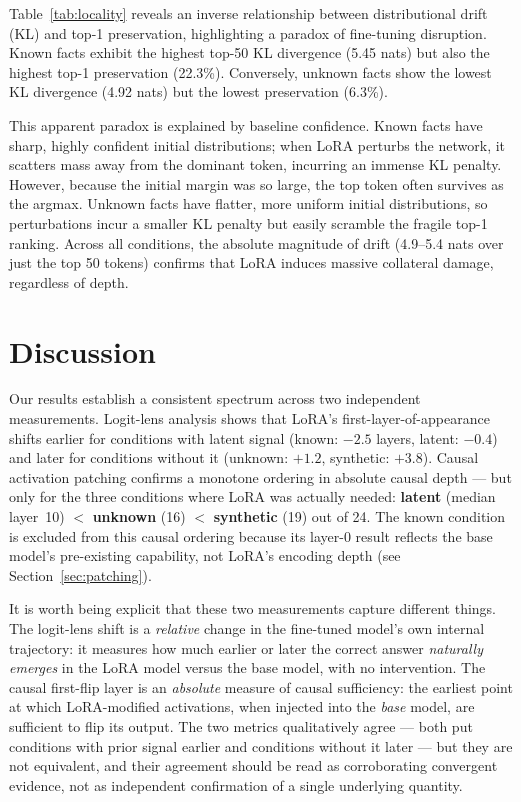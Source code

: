 \documentclass[11pt]{article}
\begin{document}
Table~\ref{tab:locality} reveals an inverse relationship between distributional drift (KL) and top-1 preservation, highlighting a paradox of fine-tuning disruption. Known facts exhibit the highest top-50 KL divergence (5.45 nats) but also the highest top-1 preservation (22.3\%). Conversely, unknown facts show the lowest KL divergence (4.92 nats) but the lowest preservation (6.3\%).

This apparent paradox is explained by baseline confidence. Known facts have sharp, highly confident initial distributions; when LoRA perturbs the network, it scatters mass away from the dominant token, incurring an immense KL penalty. However, because the initial margin was so large, the top token often survives as the argmax. Unknown facts have flatter, more uniform initial distributions, so perturbations incur a smaller KL penalty but easily scramble the fragile top-1 ranking. Across all conditions, the absolute magnitude of drift (4.9--5.4 nats over just the top 50 tokens) confirms that LoRA induces massive collateral damage, regardless of depth.

\section{Discussion}

Our results establish a consistent spectrum across two independent measurements.
Logit-lens analysis shows that LoRA's first-layer-of-appearance shifts earlier
for conditions with latent signal (known: $-2.5$ layers, latent: $-0.4$) and
later for conditions without it (unknown: $+1.2$, synthetic: $+3.8$).
Causal activation patching confirms a monotone ordering in absolute causal
depth --- but only for the three conditions where LoRA was actually needed:
\textbf{latent} (median layer~10) $<$ \textbf{unknown} (16) $<$
\textbf{synthetic} (19) out of 24.
The known condition is excluded from this causal ordering because its layer-0
result reflects the base model's pre-existing capability, not LoRA's encoding
depth (see Section~\ref{sec:patching}).

It is worth being explicit that these two measurements capture different things.
The logit-lens shift is a \emph{relative} change in the fine-tuned model's own
internal trajectory: it measures how much earlier or later the correct answer
\emph{naturally emerges} in the LoRA model versus the base model, with no
intervention.
The causal first-flip layer is an \emph{absolute} measure of causal sufficiency:
the earliest point at which LoRA-modified activations, when injected into the
\emph{base} model, are sufficient to flip its output.
The two metrics qualitatively agree --- both put conditions with prior signal
earlier and conditions without it later --- but they are not equivalent, and
their agreement should be read as corroborating convergent evidence, not as
independent confirmation of a single underlying quantity.
\end{document}
